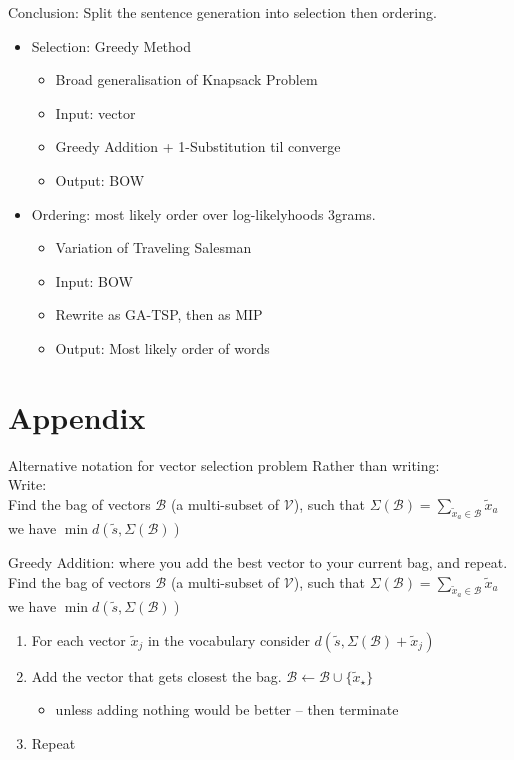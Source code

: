\documentclass[]{beamer}
\newcommand{\s}{\tilde{s}}
\newcommand{\x}{\tilde{x}}
\newcommand{\V}{\mathcal{V}}
\newcommand{\B}{\mathcal{B}}
\begin{document}



\begin{frame}{Conclusion: Split the sentence generation into selection then ordering.}
	\begin{itemize}
		\item<1->Selection: Greedy Method
		\begin{itemize}
			\item Broad generalisation of Knapsack Problem
			\item Input: vector
			\item Greedy Addition + 1-Substitution til converge
			\item Output: BOW
		\end{itemize}
		\vfill
		\item<2->Ordering: most likely order over log-likelyhoods 3grams.
		\begin{itemize}
			\item Variation of Traveling Salesman
			\item Input: BOW
			\item Rewrite as GA-TSP, then as MIP
			\item Output: Most likely order of words
		\end{itemize}
	\end{itemize}
\end{frame}

\section{Appendix}

\newcommand{\vectorselectionproblemdefnalt}{Find the bag of vectors $\B$ (a multi-subset of $\V$), such that $\displaystyle \Sigma(\B)=\sum_{\x_a\in\B}\x_a$ we have  $\min d(\s,\Sigma(\B))$}

\begin{frame}{Alternative notation for vector selection problem}
	Rather than writing:\\
	\vectorselectionproblemdefn
	\vfill
	Write:\\
	\vectorselectionproblemdefnalt
	\vfill
\end{frame}


\begin{frame}{Greedy Addition: where you add the best vector to your current bag, and repeat.}
	\vectorselectionproblemdefnalt
	\vfill
	\begin{enumerate}
		\item For each vector $\x_j$ in the vocabulary consider  $d(\s, \Sigma(\B)+\x_j)$
		\item Add the vector that gets closest the bag. $\B\leftarrow\B\cup\{\x_\star\}$
		\begin{itemize}
			\item unless adding nothing would be better -- then terminate
		\end{itemize}
		\item Repeat
	\end{enumerate}
	\vfill
\end{frame}
\end{document}
